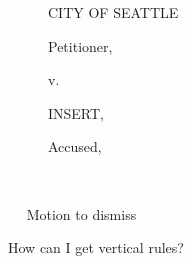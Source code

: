 \documentclass{article}
\newcommand{\rulesep}{\unskip\ \vrule\ }
\begin{document}
\begin{figure*}[ht!]
\begin{subfigure}[t]{.32\textwidth}

  CITY OF SEATTLE


  \tab \tab \tab Petitioner,

  \tab \tab v.

  INSERT,

  \tab \tab \tab Accused,

  \makebox[1.5in]{\hrulefill}
  \rulesep
\end{subfigure}
\rulesep
Motion to dismiss
\caption{How can I get vertical rules?}
\end{figure*}
\end{document}
